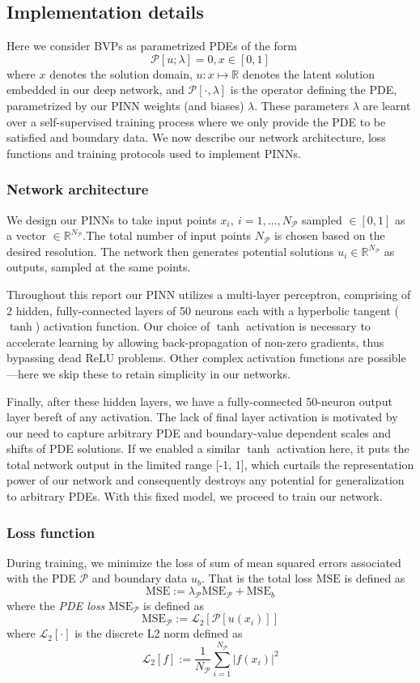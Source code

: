 \documentclass[11pt]{article}
\newcommand{\abs}[1]{\left\lvert#1\right\rvert}
\newcommand{\mse}{\textrm{MSE}}
\newcommand{\pde}{\ensuremath{\mathcal{P}}}
\newcommand{\Ltwo}[1]{\ensuremath{\mathcal{L}_2\left[#1\right]}}
\begin{document}
\subsection{Implementation details}
\label{sec:orgc31aab7}
Here we consider BVPs as parametrized PDEs of the form
\[ \mathcal{P}[u ; \lambda] = 0, x \in [0, 1] \]
where \(x\) denotes the solution domain, \(u : x \mapsto \mathbb{R}\)
denotes the latent solution embedded in
our deep network, and \(\pde[\cdot, \lambda]\) is the operator defining the PDE,
parametrized by our PINN weights (and biases) \(\lambda\). These
parameters \(\lambda\) are learnt over a self-supervised training process
where we only provide the PDE to be satisfied and boundary data.
We now describe our network architecture, loss functions and training protocols used to implement PINNs.

\subsubsection{Network architecture}
\label{sec:orgae9cba9}
We design our PINNs to take input points \(x_i,~i = 1, \dots,  N_\pde\)
sampled \(\in [0, 1]\) as a vector \(\in \mathbb{R}^{N_\pde}\).The total
number of input points \(N_\pde\) is chosen based on the desired resolution. The network then
generates potential solutions
\(u_i \in \mathbb{R}^{N_\pde}\) as outputs, sampled at the same points.

Throughout this report our PINN utilizes a multi-layer perceptron, comprising of 2
hidden, fully-connected layers of 50 neurons each with a hyperbolic tangent
(\(\tanh\)) activation function. Our choice of \(\tanh\) activation is
necessary to accelerate learning by allowing back-propagation of non-zero
gradients, thus bypassing dead ReLU problems.
Other complex activation functions \cite{jagtap2020adaptive} are possible---here we
skip these to retain simplicity in our networks.

Finally, after these hidden layers, we have a fully-connected
50-neuron output layer bereft of any activation. The lack of final layer
activation is motivated by our need to capture arbitrary PDE and
boundary-value dependent scales and shifts of PDE solutions. If we
enabled a similar \(\tanh\) activation here, it puts the total network
output in the limited range [-1, 1], which curtails the representation power
of our network and consequently destroys any potential for generalization to
arbitrary PDEs. With this fixed model, we proceed to train our network.

\subsubsection{Loss function}
\label{sec:orge2e771c}
During training, we minimize the loss of sum of mean squared errors
associated with the PDE \(\pde\) and boundary data \(u_{b}\). That
is the total loss \(\mse\) is defined as
\[ \mse := \lambda_{\pde} \mse_{\pde} + \mse_{b} \]
where the \emph{PDE loss} \(\mse_{\pde}\) is defined as
\[ \mse_{\pde} :=  \Ltwo{\pde[u(x_i)]}\]
where \(\Ltwo{\cdot}\) is the discrete L2 norm defined as
\[ \Ltwo{f} := \frac{1}{N_\pde}\sum_{i=1}^{N_\pde} \abs{f(x_i)}^2 \]
\end{document}

